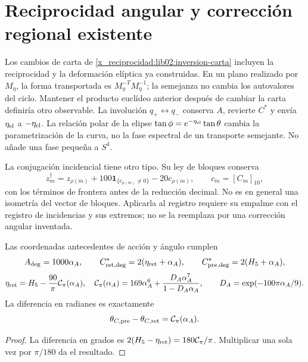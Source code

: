 \section{Reciprocidad angular y corrección regional existente}
\label{x_reciprocidad:lib02:correccion-regional}

Los cambios de carta de \cref{x_reciprocidad:lib02:inversion-carta} incluyen la
reciprocidad y la deformación elíptica ya construidas. En un plano
realizado por \(M_\eta\), la forma transportada es
\(M_\eta^{-T}M_\eta^{-1}\); la semejanza no cambia los
autovalores del ciclo. Mantener el producto euclídeo anterior después de
cambiar la carta definiría otro observable. La involución
\(q_+\leftrightarrow q_-\) conserva \(A\), revierte \(C^*\)
y envía \(\eta_{\rm el}\) a \(-\eta_{\rm el}\). La relación
polar de la elipse
\(\tan\phi=e^{-\eta_{\rm el}}\tan\theta\) cambia la
parametrización de la curva, no la fase espectral de un transporte
semejante. No añade una fase pequeña a \(S^4\).

La conjugación incidencial tiene otro tipo. Su ley de bloques conserva
\[
 z_m^\dagger=z_{\rho(m)}
 +100\mathbf1_{\{c_{\rho(m)}\ne0\}}-20c_{\rho(m)},
 \qquad c_m=[C_m]_{10},
\]
con los términos de frontera antes de la reducción decimal. No es en
general una isometría del vector de bloques. Aplicarla al registro
requiere su empalme con el registro de incidencias y sus extremos; no se la
reemplaza por una corrección angular inventada.

\begin{proposition}
\label{x_reciprocidad:lib02:retorno-regional}
Las coordenadas antecedentes de acción y ángulo cumplen
\[
 A_{\rm deg}=1000\alpha_A,\qquad
 C^*_{\rm ret,deg}=2(\eta_{\rm ret}+\alpha_A),\qquad
 C^*_{\rm pre,deg}=2(H_5+\alpha_A),
\]
\[
 \eta_{\rm ret}=H_5-\frac{90}{\pi}\mathcal C_\pi(\alpha_A),
 \quad
 \mathcal C_\pi(\alpha_A)=169\alpha_A^6+
 \frac{D_A\alpha_A^7}{1-D_A\alpha_A},\qquad
 D_A=\exp(-100\pi\alpha_A/9).
\]
La diferencia en radianes es exactamente
\[
 \theta_{C,\rm pre}-\theta_{C,\rm ret}=\mathcal C_\pi(\alpha_A).
\]
\end{proposition}
\begin{proof}
La diferencia en grados es
\(2(H_5-\eta_{\rm ret})=180\mathcal C_\pi/\pi\).
Multiplicar una sola vez por \(\pi/180\) da el resultado.
\end{proof}

